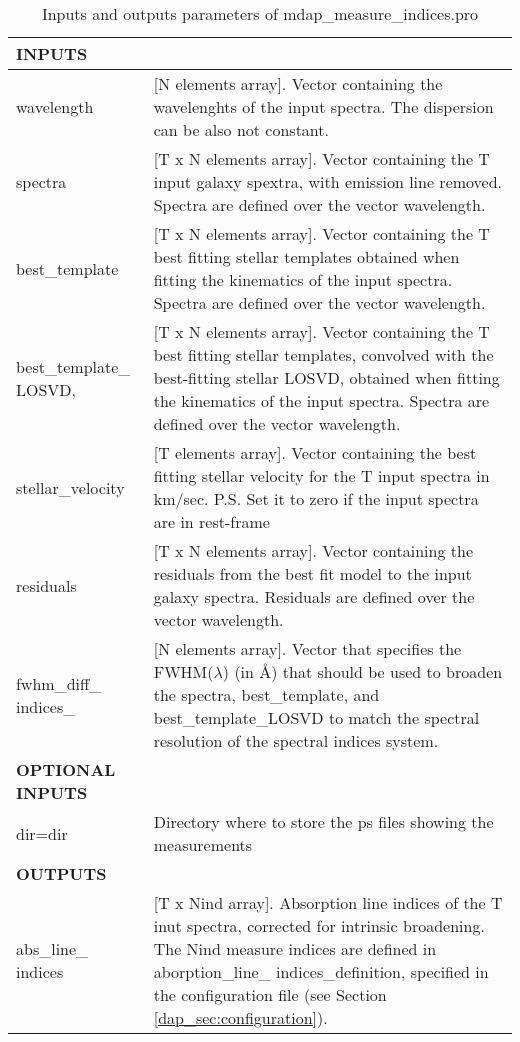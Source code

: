 \begin{center}
\begin{longtable}{p{2.7cm}| p{11.1cm}}
\caption{Inputs and outputs parameters of mdap\_measure\_indices.pro} \label{dap_tab:mdap_measure_indices} \\
\hline
\endfirsthead
\hline
\endhead
\hline
\endlastfoot
\hline
{\bf  INPUTS} & \\
\hline
wavelength & [N elements array]. Vector containing the wavelenghts of the input spectra. The dispersion can be also not constant.\\
%
spectra & [T x N elements array].  Vector containing the T input galaxy spextra, with emission line removed. Spectra are defined over the vector wavelength.\\
%
best\_template & [T x N elements array]. Vector containing the T best fitting stellar templates obtained when fitting the kinematics of the input spectra. 
                Spectra are defined over the vector wavelength.\\
%
best\_template\_ LOSVD, & [T x N elements array]. Vector containing the T best fitting stellar templates, convolved with the best-fitting stellar LOSVD, obtained when 
                  fitting the kinematics of the input spectra. Spectra are defined over the vector wavelength. \\
%
stellar\_velocity & [T elements array]. Vector containing the best fitting stellar velocity for the T input spectra in km/sec. P.S. Set it to zero if the input spectra are in rest-frame\\
%
residuals & [T x N elements array]. Vector containing the residuals from the best fit model to the input galaxy spectra. Residuals are defined over the vector wavelength.  \\
%
fwhm\_diff\_ indices\_ & [N elements array]. Vector that specifies the FWHM($\lambda$) (in \AA) that should be used to broaden the spectra, best\_template, and best\_template\_LOSVD to match the spectral resolution of the spectral indices system.\\
\hline 
{\bf OPTIONAL INPUTS} & \\
\hline
dir=dir  &  Directory where to store the ps files showing the measurements \\
%
\hline
{\bf OUTPUTS} & \\
\hline
abs\_line\_ indices & [T x Nind array]. Absorption line indices of the T inut spectra, corrected for intrinsic broadening. The Nind measure indices are defined in 
   aborption\_line\_ indices\_definition, specified in the configuration file (see Section \ref{dap_sec:configuration}).\\

\end{longtable}
\end{center}
